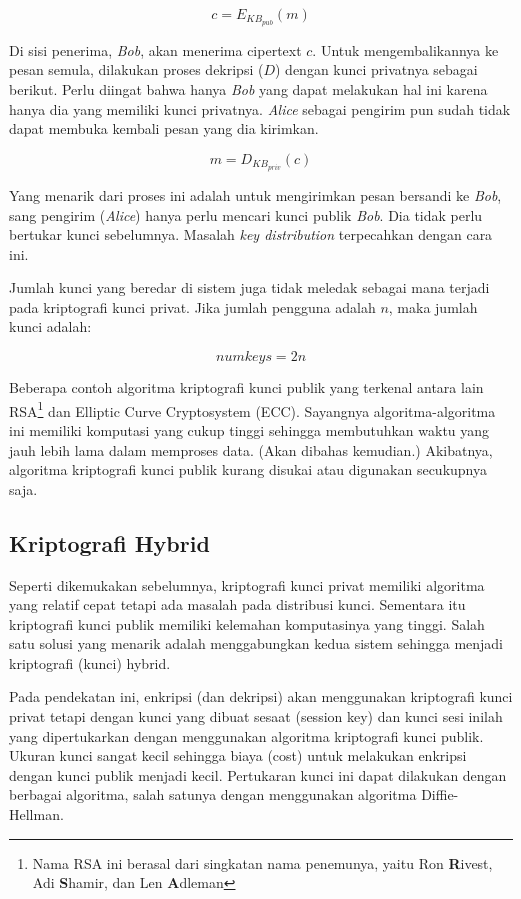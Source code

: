 \begin{equation}
   c = E_{KB_{pub}}(m)
\end{equation}

Di sisi penerima, {\em Bob}, akan menerima cipertext $c$. Untuk
mengembalikannya ke pesan semula, dilakukan proses dekripsi ($D$) dengan kunci
privatnya sebagai berikut. Perlu diingat bahwa hanya {\em Bob} yang dapat
melakukan hal ini karena hanya dia yang memiliki kunci privatnya. {\em Alice}
sebagai pengirim pun sudah tidak dapat membuka kembali pesan yang dia kirimkan.

\begin{equation}
   m = D_{KB_{priv}}(c)
\end{equation}

Yang menarik dari proses ini adalah untuk mengirimkan pesan bersandi ke {\em
Bob}, sang pengirim ({\em Alice}) hanya perlu mencari kunci publik {\em Bob}.
Dia tidak perlu bertukar kunci sebelumnya. Masalah {\em key distribution}
terpecahkan dengan cara ini.

Jumlah kunci yang beredar di sistem juga tidak meledak sebagai mana terjadi
pada kriptografi kunci privat. Jika jumlah pengguna adalah $n$, maka jumlah
kunci adalah:

\begin{equation}
   numkeys = 2n
\end{equation}

Beberapa contoh algoritma kriptografi kunci publik yang terkenal antara lain
RSA\footnote{Nama RSA ini berasal dari singkatan nama penemunya, yaitu Ron {\bf
R}ivest, Adi {\bf S}hamir, dan Len {\bf A}dleman} dan Elliptic Curve
Cryptosystem (ECC).  Sayangnya algoritma-algoritma ini memiliki komputasi yang
cukup tinggi sehingga membutuhkan waktu yang jauh lebih lama dalam memproses
data. (Akan dibahas kemudian.) Akibatnya, algoritma kriptografi kunci publik
kurang disukai atau digunakan secukupnya saja.


\subsection{Kriptografi Hybrid}
Seperti dikemukakan sebelumnya, kriptografi kunci privat memiliki algoritma
yang relatif cepat tetapi ada masalah pada distribusi kunci. Sementara itu
kriptografi kunci publik memiliki kelemahan komputasinya yang tinggi. Salah
satu solusi yang menarik adalah menggabungkan kedua sistem sehingga menjadi
kriptografi (kunci) hybrid.

Pada pendekatan ini, enkripsi (dan dekripsi) akan menggunakan kriptografi kunci
privat tetapi dengan kunci yang dibuat sesaat (session key) dan kunci sesi
inilah yang dipertukarkan dengan menggunakan algoritma kriptografi kunci
publik. Ukuran kunci sangat kecil sehingga biaya (cost) untuk melakukan
enkripsi dengan kunci publik menjadi kecil. Pertukaran kunci ini dapat
dilakukan dengan berbagai algoritma, salah satunya dengan menggunakan algoritma
Diffie-Hellman.

